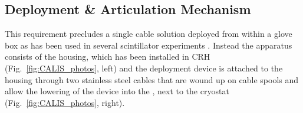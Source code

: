 \subsection{Deployment \& Articulation Mechanism}\label{sec:DeploymentArticulation}
This requirement precludes a single cable solution deployed from within a glove box as has been used in several scintillator experiments \cite{KamLAND-MiniCal, DayaBay_zaxis}. Instead the apparatus consists of the housing, which has been installed in CRH (Fig.~\ref{fig:CALIS_photos}, left) and the deployment device is attached to the housing through two stainless steel cables that are wound up on cable spools and allow the lowering of the device into the \lsv, next to the cryostat (Fig.~\ref{fig:CALIS_photos}, right).
